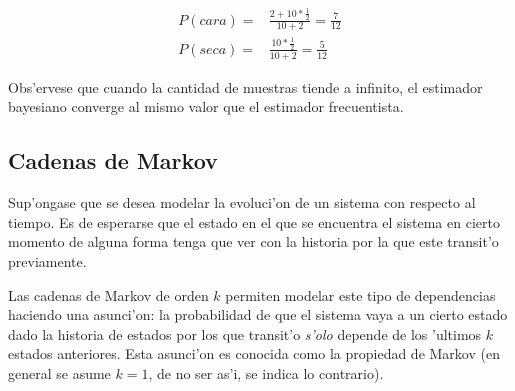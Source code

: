 \begin{align*}
P(cara) =& \frac{2 + 10*\frac{1}{2}}{10+2}  =\frac{7}{12} \\
P(seca) =& \frac{10*\frac{1}{2}}{10+2}      = \frac{5}{12}
\end{align*}

Obs'ervese que cuando la cantidad de muestras tiende a infinito, el estimador bayesiano converge al mismo valor que el estimador frecuentista.
%
%
%
%
%

\subsection{Cadenas de Markov}
Sup'ongase que se desea modelar la evoluci'on de un sistema con respecto al tiempo. Es de esperarse que 
el estado en el que se encuentra el sistema en cierto momento de alguna forma tenga que ver con la historia por la que este transit'o
previamente. 

Las cadenas de Markov de orden $k$ permiten modelar este tipo de dependencias haciendo una asunci'on: la probabilidad de que el sistema vaya a un cierto estado
dado la historia de estados por los que transit'o \emph{s'olo} depende de los 'ultimos $k$ estados anteriores. 
Esta asunci'on es conocida como la propiedad de Markov (en general se asume $k=1$, de no ser as'i, se indica lo contrario). 

